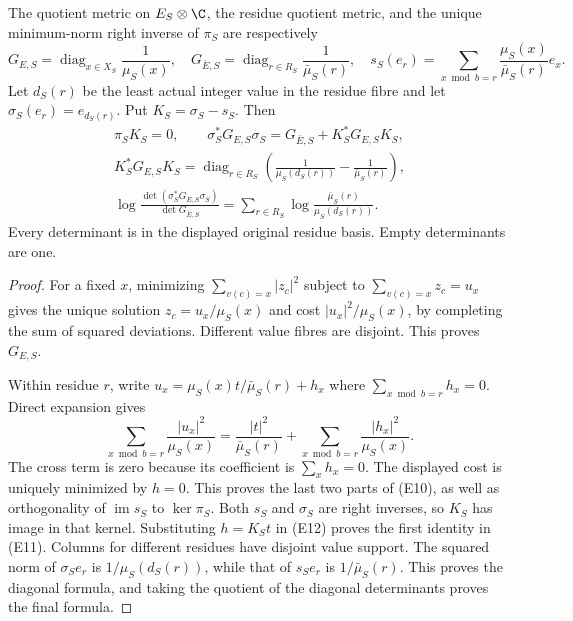 \begin{theorem}
The quotient metric on \(E_S\otimes\C\), the residue quotient metric,
and the unique minimum-norm right inverse of \(\pi_S\) are respectively
\[
 G_{E,S}=\operatorname{diag}_{x\in X_S}\frac1{\mu_S(x)},\quad
 G_{\bar E,S}=\operatorname{diag}_{r\in R_S}\frac1{\bar\mu_S(r)},\quad
 s_S(e_r)=\sum_{x\bmod b=r}\frac{\mu_S(x)}{\bar\mu_S(r)}e_x .
 \tag{E10}
\]
Let \(d_S(r)\) be the least actual integer value in the residue fibre
and let \(\sigma_S(e_r)=e_{d_S(r)}\).  Put \(K_S=\sigma_S-s_S\).
Then
\[
 \begin{gathered}
 \pi_SK_S=0,\qquad
 \sigma_S^*G_{E,S}\sigma_S
   =G_{\bar E,S}+K_S^*G_{E,S}K_S,\\
 K_S^*G_{E,S}K_S
   =\operatorname{diag}_{r\in R_S}
       \left(\frac1{\mu_S(d_S(r))}-\frac1{\bar\mu_S(r)}\right),\\
 \log\frac{\det(\sigma_S^*G_{E,S}\sigma_S)}{\det G_{\bar E,S}}
   =\sum_{r\in R_S}\log\frac{\bar\mu_S(r)}{\mu_S(d_S(r))}.
 \end{gathered}
 \tag{E11}
\]
Every determinant is in the displayed original residue basis.  Empty
determinants are one.
\end{theorem}
\begin{proof}
For a fixed \(x\), minimizing \(\sum_{v(c)=x}|z_c|^2\) subject to
\(\sum_{v(c)=x}z_c=u_x\) gives the unique solution
\(z_c=u_x/\mu_S(x)\) and cost \(|u_x|^2/\mu_S(x)\), by completing
the sum of squared deviations.  Different value fibres are disjoint.
This proves \(G_{E,S}\).

Within residue \(r\), write \(u_x=\mu_S(x)t/\bar\mu_S(r)+h_x\)
where \(\sum_{x\bmod b=r}h_x=0\).  Direct expansion gives
\[
 \sum_{x\bmod b=r}\frac{|u_x|^2}{\mu_S(x)}
 =\frac{|t|^2}{\bar\mu_S(r)}
  +\sum_{x\bmod b=r}\frac{|h_x|^2}{\mu_S(x)} .
 \tag{E12}
\]
The cross term is zero because its coefficient is
\(\sum_xh_x=0\).  The displayed cost is uniquely minimized by \(h=0\).
This proves the last two parts of (E10), as well as orthogonality of
\(\operatorname{im}s_S\) to \(\ker\pi_S\).  Both \(s_S\) and
\(\sigma_S\) are right inverses, so \(K_S\) has image in that kernel.
Substituting \(h=K_St\) in (E12) proves the first identity in (E11).
Columns for different residues have disjoint value support.
The squared norm of \(\sigma_Se_r\) is
\(1/\mu_S(d_S(r))\), while that of \(s_Se_r\) is
\(1/\bar\mu_S(r)\).  This proves the diagonal formula, and taking
the quotient of the diagonal determinants proves the final formula.
\end{proof}

